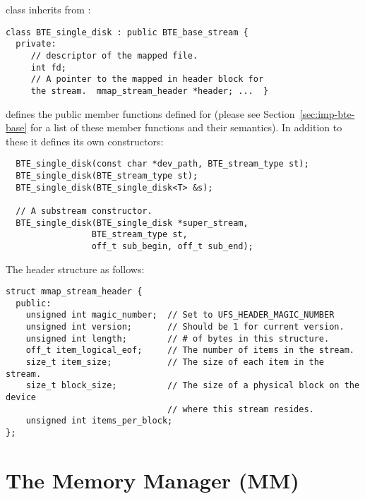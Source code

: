  class inherits from
:
\begin{verbatim}
class BTE_single_disk : public BTE_base_stream { 
  private:
     // descriptor of the mapped file.  
     int fd;
     // A pointer to the mapped in header block for
     the stream.  mmap_stream_header *header; ...  }
\end{verbatim}

 defines the public member
functions defined for  (please see
Section~\ref{sec:imp-bte-base} for a list of these member
functions and their semantics).  In addition to these it
defines its own constructors: 
\begin{verbatim}
  BTE_single_disk(const char *dev_path, BTE_stream_type st); 
  BTE_single_disk(BTE_stream_type st); 
  BTE_single_disk(BTE_single_disk<T> &s); 
  
  // A substream constructor.
  BTE_single_disk(BTE_single_disk *super_stream,
                 BTE_stream_type st,
                 off_t sub_begin, off_t sub_end);
\end{verbatim}

The  header structure as follows:
\begin{verbatim}
struct mmap_stream_header { 
  public:
    unsigned int magic_number;  // Set to UFS_HEADER_MAGIC_NUMBER
    unsigned int version;       // Should be 1 for current version.
    unsigned int length;        // # of bytes in this structure.
    off_t item_logical_eof;     // The number of items in the stream.
    size_t item_size;           // The size of each item in the stream.
    size_t block_size;          // The size of a physical block on the device
                                // where this stream resides.
    unsigned int items_per_block;
};
\end{verbatim}




\section{The Memory Manager (MM)}

